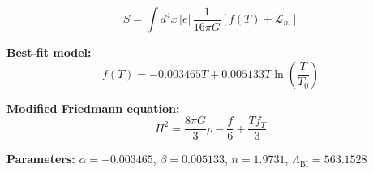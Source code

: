 
\begin{equation}
  S = \int d^4x \, |e| \, \frac{1}{16\pi G} \left[ f(T) + \mathcal{L}_m \right]
\end{equation}

\textbf{Best-fit model:}
\begin{equation}
  f(T) = -0.003465 T + 0.005133 T \ln\!\left(\frac{T}{T_0}\right)
\end{equation}

\textbf{Modified Friedmann equation:}
\begin{equation}
  H^2 = \frac{8\pi G}{3} \rho - \frac{f}{6} + \frac{T f_T}{3}
\end{equation}

\textbf{Parameters:}
$\alpha = -0.003465$, \quad
$\beta = 0.005133$, \quad
$n = 1.9731$, \quad
$\Lambda_{\text{BI}} = 563.1528$